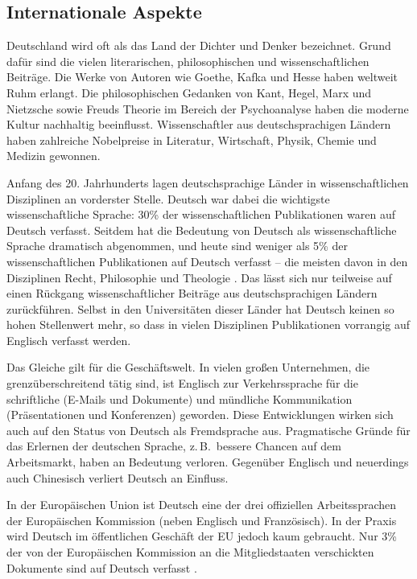 \documentclass[]{../../metanetpaper}
\begin{document}
\begin{multicols}{2}
\subsection{Internationale Aspekte}

Deutschland wird oft als das Land der Dichter und Denker bezeichnet. Grund dafür sind die vielen literarischen, philosophischen und wissenschaftlichen Beiträge. Die Werke von Autoren wie Goethe, Kafka und Hesse haben weltweit Ruhm erlangt. Die philosophischen Gedanken von Kant, Hegel, Marx und Nietzsche sowie Freuds Theorie im Bereich der Psychoanalyse haben die moderne Kultur nachhaltig beeinflusst. Wissenschaftler aus deutschsprachigen Ländern haben zahlreiche Nobelpreise in Literatur, Wirtschaft, Physik, Chemie und Medizin gewonnen.

Anfang des 20. Jahrhunderts lagen deutschsprachige Länder in wissenschaftlichen Disziplinen an vorderster Stelle. Deutsch war dabei die wichtigste wissenschaftliche Sprache: 30\% der wissenschaftlichen Publikationen waren auf Deutsch verfasst. Seitdem hat die Bedeutung von Deutsch als wissenschaftliche Sprache dramatisch abgenommen, und heute sind weniger als 5\% der wissenschaftlichen Publikationen auf Deutsch verfasst -- die meisten davon in den Disziplinen Recht, Philosophie und Theologie \cite{joy1}. Das lässt sich nur teilweise auf einen Rückgang wissenschaftlicher Beiträge aus deutschsprachigen Ländern zurückführen. Selbst in den Universitäten dieser Länder hat Deutsch keinen so hohen Stellenwert mehr, so dass in vielen Disziplinen Publikationen vorrangig auf Englisch verfasst werden.


Das Gleiche gilt für die Geschäftswelt. In vielen großen Unternehmen, die grenzüberschreitend tätig sind, ist Englisch zur Verkehrssprache für die schriftliche (E-Mails und Dokumente) und mündliche Kommunikation (Präsentationen und Konferenzen) geworden. Diese Entwicklungen wirken sich auch auf den Status von Deutsch als Fremdsprache aus. Pragmatische Gründe für das Erlernen der deutschen Sprache, z.\,B.~bessere Chancen auf dem Arbeitsmarkt, haben an Bedeutung verloren. Gegenüber Englisch und neuerdings auch Chinesisch verliert Deutsch an Einfluss. 

In der Europäischen Union ist Deutsch eine der drei offiziellen Arbeitssprachen der Europäischen Kommission (neben Englisch und Französisch). In der Praxis wird Deutsch im öffentlichen Geschäft der EU jedoch kaum gebraucht. Nur 3\% der von der Europäischen Kommission an die Mitgliedstaaten verschickten Dokumente sind auf Deutsch verfasst \cite{joy1}. 


\end{multicols}
\end{document}
